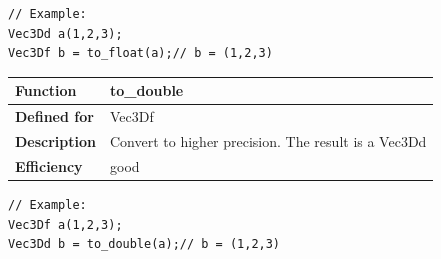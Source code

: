 \documentclass[11pt,a4paper,oneside,openright]{report}
\newcommand{\vspacesmall}{\vspace{3mm}}
\newcommand{\vspacebig}{\vspace{6mm}}
\begin{document}
\begin{lstlisting}[frame=none]
// Example:
Vec3Dd a(1,2,3);
Vec3Df b = to_float(a);// b = (1,2,3)
\end{lstlisting}
\vspacebig


\begin{tabular}{|p{25mm}|p{100mm}|}
\hline
\bfseries Function & to\_double \\ \hline
\bfseries Defined for & Vec3Df  \\ \hline
\bfseries Description & Convert to higher precision. The result is a Vec3Dd \\ \hline
\bfseries Efficiency & good \\ \hline
\end{tabular}
\vspacesmall

\begin{lstlisting}[frame=none]
// Example:
Vec3Df a(1,2,3);
Vec3Dd b = to_double(a);// b = (1,2,3)
\end{lstlisting}
\vspacebig
\end{document}
